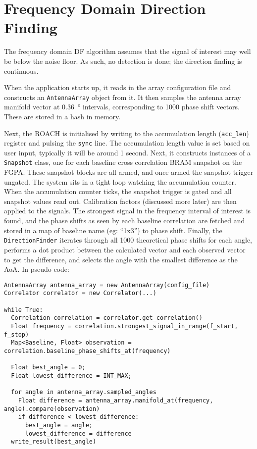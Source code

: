 \section{Frequency Domain Direction Finding}
The frequency domain DF algorithm assumes that the signal of interest may well be below the noise floor. As such, no detection is done; the direction finding is continuous. 

When the application starts up, it reads in the array configuration file and constructs an \lstinline{AntennaArray} object from it. It then samples the antenna array manifold vector at \SI{0.36}{\degree} intervals, corresponding to 1000 phase shift vectors. These are stored in a hash in memory. 

Next, the ROACH is initialised by writing to the accumulation length (\lstinline{acc_len}) register and pulsing the \lstinline{sync} line. The accumulation length value is set based on user input, typically it will be around 1 second. Next, it constructs instances of a \lstinline{Snapshot} class, one for each baseline cross correlation BRAM snapshot on the FGPA. These snapshot blocks are all armed, and once armed the snapshot trigger ungated. The system sits in a tight loop watching the accumulation counter. When the accumulation counter ticks, the snapshot trigger is gated and all snapshot values read out. Calibration factors (discussed more later) are then applied to the signals. The strongest signal in the frequency interval of interest is found, and the phase shifts as seen by each baseline correlation are fetched and stored in a map of baseline name (eg: ``1x3'')  to phase shift. Finally, the \lstinline{DirectionFinder} iterates through all 1000 theoretical phase shifts for each angle, performs a dot product between the calculated vector and each observed vector to get the difference, and selects the angle with the smallest difference as the AoA. In pseudo code:

\begin{lstlisting}
AntennaArray antenna_array = new AntennaArray(config_file)
Correlator correlator = new Correlator(...)

while True:
  Correlation correlation = correlator.get_correlation()
  Float frequency = correlation.strongest_signal_in_range(f_start, f_stop)
  Map<Baseline, Float> observation = correlation.baseline_phase_shifts_at(frequency)

  Float best_angle = 0;
  Float lowest_difference = INT_MAX;

  for angle in antenna_array.sampled_angles
    Float difference = antenna_array.manifold_at(frequency, angle).compare(observation)
    if difference < lowest_difference:
      best_angle = angle;
      lowest_difference = difference
  write_result(best_angle)
\end{lstlisting}

